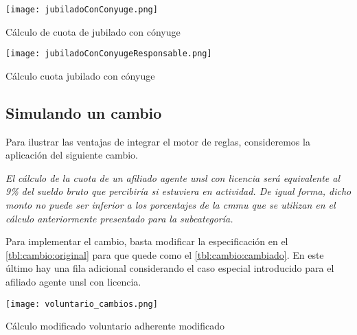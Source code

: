 \begin{table*}
    \centering
    \texttt{[image: jubiladoConConyuge.png]}
    \caption{Cálculo de cuota de jubilado con cónyuge}
    \label{tbl:calculo:jubilado:conconyuge}
\end{table*}

\begin{table*}
    \centering
    \texttt{[image: jubiladoConConyugeResponsable.png]}
    \caption{Cálculo cuota jubilado con cónyuge}
    \label{tbl:calculo:jubilado:conyuge:responsable}
\end{table*}

\subsection{Simulando un cambio}
\label{ssec:integracion:cambio}

Para ilustrar las ventajas de integrar el motor de reglas, consideremos la aplicación del siguiente cambio.

\emph{
El cálculo de la cuota de un afiliado agente \acrshort{unsl} con licencia será equivalente al 9\% del sueldo bruto que percibiría si estuviera en actividad. 
De igual forma, dicho monto no puede ser inferior a los porcentajes de la \acrshort{cmmu} que se utilizan en el cálculo anteriormente presentado para la subcategoría.
}

Para implementar el cambio, basta modificar la especificación en el \cref{tbl:cambio:original} para que quede como el \cref{tbl:cambio:cambiado}. 
En este último hay una fila adicional considerando el caso especial introducido para el afiliado agente \acrshort{unsl} con licencia.

\begin{table*}
    \centering
    \texttt{[image: voluntario\_cambios.png]}
    \caption{Cálculo modificado voluntario adherente modificado}
    \label{tbl:cambio:cambiado}
\end{table*}

